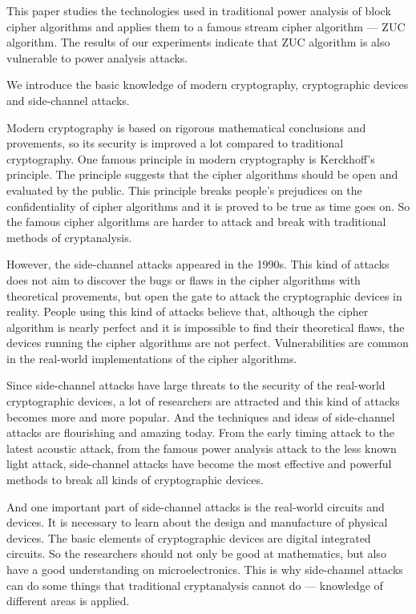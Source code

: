 \begin{bigabstract} %
This paper studies the technologies used in traditional power analysis of block cipher algorithms and applies them to a famous stream cipher algorithm --- ZUC algorithm. The results of our experiments indicate that ZUC algorithm is also vulnerable to power analysis attacks.

We introduce the basic knowledge of modern cryptography, cryptographic devices and side-channel attacks. 

Modern cryptography is based on rigorous mathematical conclusions and provements, so its security is improved a lot compared to traditional cryptography. One famous principle in modern cryptography is Kerckhoff's principle. The principle suggests that the cipher algorithms should be open and evaluated by the public. This principle breaks people's prejudices on the confidentiality of cipher algorithms and it is proved to be true as time goes on. So the famous cipher algorithms are harder to attack and break with traditional methods of cryptanalysis.

However, the side-channel attacks appeared in the 1990s. This kind of attacks does not aim to discover the bugs or flaws in the cipher algorithms with theoretical provements, but open the gate to attack the cryptographic devices in reality. People using this kind of attacks believe that, although the cipher algorithm is nearly perfect and it is impossible to find their theoretical flaws, the devices running the cipher algorithms are not perfect. Vulnerabilities are common in the real-world implementations of the cipher algorithms.

Since side-channel attacks have large threats to the security of the real-world cryptographic devices, a lot of researchers are attracted and this kind of attacks becomes more and more popular. And the techniques and ideas of side-channel attacks are flourishing and amazing today. From the early timing attack to the latest acoustic attack, from the famous power analysis attack to the less known light attack, side-channel attacks have become the most effective and powerful methods to break all kinds of cryptographic devices.

And one important part of side-channel attacks is the real-world circuits and devices. It is necessary to learn about the design and manufacture of physical devices. The basic elements of cryptographic devices are digital integrated circuits. So the researchers should not only be good at mathematics, but also have a good understanding on microelectronics. This is why side-channel attacks can do some things that traditional cryptanalysis cannot do --- knowledge of different areas is applied.



\end{bigabstract}
